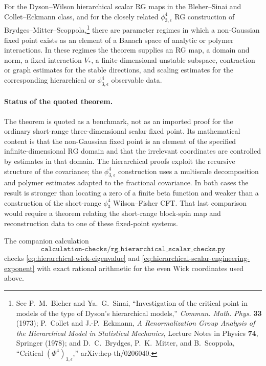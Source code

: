 \begin{quotedtheorem}
\label{qthm:hierarchical-scalar-nongaussian-fixed-point}
For the Dyson--Wilson hierarchical scalar RG maps in the
Bleher--Sinai and Collet--Eckmann class, and for the closely related
\(\phi^4_{3,\epsilon}\) RG construction of
Brydges--Mitter--Scoppola,\footnote{See P.~M.~Bleher and Ya.~G.~Sinai,
``Investigation of the critical point in models of the type of Dyson's
hierarchical models,'' \emph{Commun. Math. Phys.} \textbf{33} (1973);
P.~Collet and J.-P.~Eckmann, \emph{A Renormalization Group Analysis of the
Hierarchical Model in Statistical Mechanics}, Lecture Notes in Physics
\textbf{74}, Springer (1978); and D.~C.~Brydges, P.~K.~Mitter, and
B.~Scoppola, ``Critical \((\Phi^4)_{3,\epsilon}\),'' arXiv:hep-th/0206040.}
there are parameter regimes in which a
non-Gaussian fixed point exists as an element of a Banach space of analytic
or polymer interactions.  In these regimes the theorem supplies an RG map, a
domain and norm, a fixed interaction \(V_\ast\), a finite-dimensional
unstable subspace, contraction or graph estimates for the stable directions,
and scaling estimates for the corresponding hierarchical or
\(\phi^4_{3,\epsilon}\) observable data.
\end{quotedtheorem}

\paragraph{Status of the quoted theorem.}
The theorem is quoted as a benchmark, not as an imported proof for the
ordinary short-range three-dimensional scalar fixed point.  Its mathematical
content is that the non-Gaussian fixed point is an element of the specified
infinite-dimensional RG domain and that the irrelevant coordinates are
controlled by estimates in that domain.  The hierarchical proofs exploit the
recursive structure of the covariance; the
\(\phi^4_{3,\epsilon}\) construction uses a multiscale decomposition and
polymer estimates adapted to the fractional covariance.  In both cases the
result is stronger than locating a zero of a finite beta function and weaker
than a construction of the short-range \(\phi^4_3\) Wilson--Fisher CFT.
That last comparison would require a theorem relating the short-range
block-spin map and reconstruction data to one of these fixed-point systems.

The companion calculation
\[
  \texttt{calculation-checks/rg\_hierarchical\_scalar\_checks.py}
\]
checks \eqref{eq:hierarchical-wick-eigenvalue} and
\eqref{eq:hierarchical-scalar-engineering-exponent} with exact rational
arithmetic for the even Wick coordinates used above.

